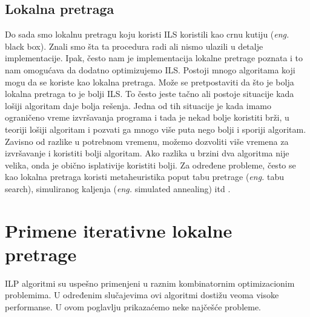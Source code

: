\documentclass[a4paper]{article}
\newcommand{\eng}[1]{(\textit{eng.} #1)}
\begin{document}
\subsection{Lokalna pretraga}

Do sada smo lokalnu pretragu koju koristi ILS koristili kao crnu kutiju \eng{black box}. Znali smo šta ta procedura radi ali nismo ulazili u detalje implementacije. Ipak, često nam je implementacija lokalne pretrage poznata 
i to nam omogućava da dodatno optimizujemo ILS. Postoji mnogo algoritama koji mogu da se koriste kao lokalna pretraga. Može se pretpostaviti da što je bolja lokalna pretraga to je bolji ILS. To često jeste tačno ali postoje 
situacije kada lošiji algoritam daje bolja rešenja. Jedna od tih situacije je kada imamo ograničeno vreme izvršavanja programa i tada je nekad bolje koristiti brži, u teoriji lošiji algoritam i pozvati ga mnogo više puta nego 
bolji i sporiji algoritam. Zavisno od razlike u potrebnom vremenu, možemo dozvoliti više vremena za izvršavanje i koristiti bolji algoritam. Ako razlika u brzini dva algoritma nije velika, onda je obično isplativije koristiti bolji. 
Za određene probleme, često se kao lokalna pretraga koristi metaheuristika poput tabu pretrage \eng{tabu search}, simuliranog kaljenja \eng{simulated annealing} itd \cite{handbookOfMetaheuristics}.



\section{Primene iterativne lokalne pretrage}
ILP algoritmi su uspešno primenjeni u raznim kombinatornim optimizacionim problemima. U određenim slučajevima ovi algoritmi dostižu veoma visoke performanse. U ovom poglavlju prikazaćemo neke najčešće probleme.
\end{document}
